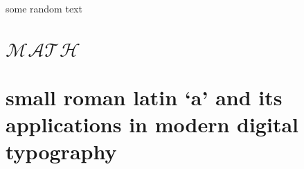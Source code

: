 \documentclass{trnotes}
\begin{document}
\tableofcontents
\clearpage
some random text

\blinddocument


\section{$\mathcal{M\!AT\!H}$\underdev}

\appendix
\section{small roman latin `a' and its appli\-cations in 
modern digital typography}
\end{document}
